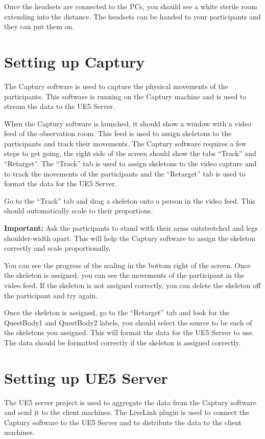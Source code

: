 Once the headsets are connected to the PCs, you should see a white sterile room extending into the distance. The headsets can be handed to your participants and they can put them on.

\section{Setting up Captury}
The Captury software is used to capture the physical movements of the participants. This software is running on the Captury machine and is used to stream the data to the UE5 Server.

When the Captury software is launched, it should show a window with a video feed of the observation room. This feed is used to assign skeletons to the participants and track their movements. The Captury software requires a few steps to get going, the right side of the screen should show the tabs ``Track'' and ``Retarget''. The ``Track'' tab is used to assign skeletons to the video capture and to track the movements of the participants and the ``Retarget'' tab is used to format the data for the UE5 Server.

Go to the ``Track'' tab and drag a skeleton onto a person in the video feed. This should automatically scale to their proportions.

\begin{tcolorbox}
    \textbf{Important: } Ask the participants to stand with their arms outstretched and legs shoulder-width apart. This will help the Captury software to assign the skeleton correctly and scale proportionally.
\end{tcolorbox}

You can see the progress of the scaling in the bottom right of the screen. Once the skeleton is assigned, you can see the movements of the participant in the video feed. If the skeleton is not assigned correctly, you can delete the skeleton off the participant and try again.

Once the skeleton is assigned, go to the ``Retarget'' tab and look for the QuestBody1 and QuestBody2 labels, you should select the source to be each of the skeletons you assigned. This will format the data for the UE5 Server to use. The data should be formatted correctly if the skeleton is assigned correctly.

\section{Setting up UE5 Server}
The UE5 server project is used to aggregate the data from the Captury software and send it to the client machines. The LiveLink plugin is used to connect the Captury software to the UE5 Server and to distribute the data to the client machines.

